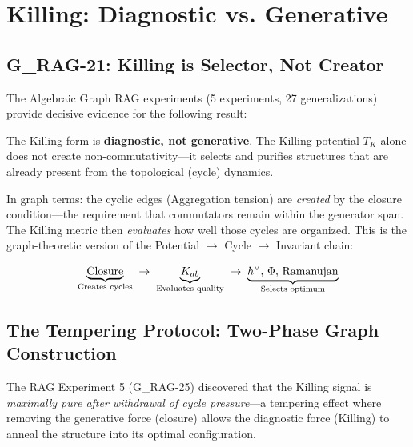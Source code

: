 \section{Killing: Diagnostic vs. Generative}\label{sec:killing_diagnostic}

\subsection{G\_RAG-21: Killing is Selector, Not Creator}\label{sec:g_rag_21}

The Algebraic Graph RAG experiments (5 experiments, 27 generalizations) provide decisive evidence for the following result:

\begin{theorem}[G\_RAG-21]\label{th:g_rag_21}
The Killing form is \textbf{diagnostic, not generative}. The Killing potential $T_K$ alone does not create non-commutativity---it selects and purifies structures that are already present from the topological (cycle) dynamics.
\end{theorem}

In graph terms: the cyclic edges (Aggregation tension) are \emph{created} by the closure condition---the requirement that commutators remain within the generator span. The Killing metric then \emph{evaluates} how well those cycles are organized. This is the graph-theoretic version of the Potential $\to$ Cycle $\to$ Invariant chain:

\begin{equation}
\underbrace{\text{Closure}}_{\text{Creates cycles}} \;\to\; \underbrace{K_{ab}}_{\text{Evaluates quality}} \;\to\; \underbrace{h^\vee, \, \Phi, \, \text{Ramanujan}}_{\text{Selects optimum}}
\end{equation}

\subsection{The Tempering Protocol: Two-Phase Graph Construction}\label{sec:tempering_protocol}

The RAG Experiment 5 (G\_RAG-25) discovered that the Killing signal is \emph{maximally pure after withdrawal of cycle pressure}---a tempering effect where removing the generative force (closure) allows the diagnostic force (Killing) to anneal the structure into its optimal configuration.

